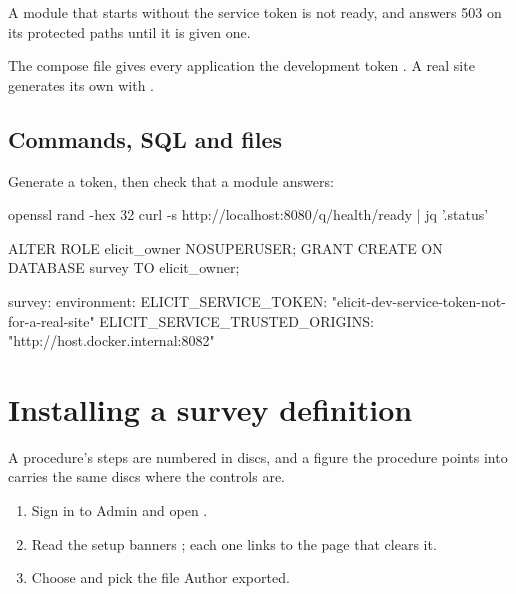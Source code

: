 \documentclass[11pt, a4paper]{article}
\begin{document}
\begin{elicitcaution}
A module that starts without the service token is not ready, and answers 503 on its
protected paths until it is given one.
\end{elicitcaution}

\begin{elicitsecurity}
The compose file gives every application the development token
. A real site generates its own with
.
\end{elicitsecurity}

\subsection{Commands, SQL and files}

Generate a token, then check that a module answers:

\begin{elicitcmd}
openssl rand -hex 32
curl -s http://localhost:8080/q/health/ready | jq '.status'
\end{elicitcmd}

\begin{elicitsql}
ALTER ROLE elicit_owner NOSUPERUSER;
GRANT CREATE ON DATABASE survey TO elicit_owner;
\end{elicitsql}

\begin{elicitfile}[fontsize = \footnotesize]
survey:
  environment:
    ELICIT_SERVICE_TOKEN: "elicit-dev-service-token-not-for-a-real-site"
    ELICIT_SERVICE_TRUSTED_ORIGINS: "http://host.docker.internal:8082"
\end{elicitfile}

\section{Installing a survey definition}
\label{sec:apply}

A procedure's steps are numbered in discs, and a figure the procedure points into carries
the same discs where the controls are.

\begin{enumerate}
  \item Sign in to Admin and open  .
  \item Read the setup banners ; each one links to the page that clears it.
  \item Choose   and pick the  file Author exported.
\end{enumerate}
\end{document}
